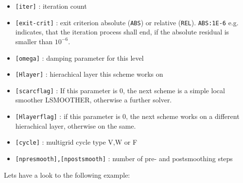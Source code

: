 \begin{itemize}
\item \verb+[iter]+  : iteration count
\item \verb+[exit-crit]+ : exit criterion absolute (\verb+ABS+) or relative (\verb+REL+). \verb+ABS:1E-6+
	    e.g. indicates, that the iteration process shall end, if the absolute residual is smaller than 
	    $10^{-6}$.  
\item \verb+[omega]+ : damping parameter for this level
\item \verb+[Hlayer]+ : hierachical layer this scheme works on
\item \verb+[scarcflag]+ : If this parameter is 0, the next scheme is a simple local
              smoother LSMOOTHER, otherwise a further \scarc{} solver.
\item \verb+[Hlayerflag]+ : if this parameter is 0, the next scheme works on a different
               hierachical layer, otherwise on the same.
\item \verb+[cycle]+ : multigrid cycle type V,W or F
\item \verb+[npresmooth],[npostsmooth]+ : number of pre- and postsmoothing steps
\end{itemize}

Lets have a look to the following example:

